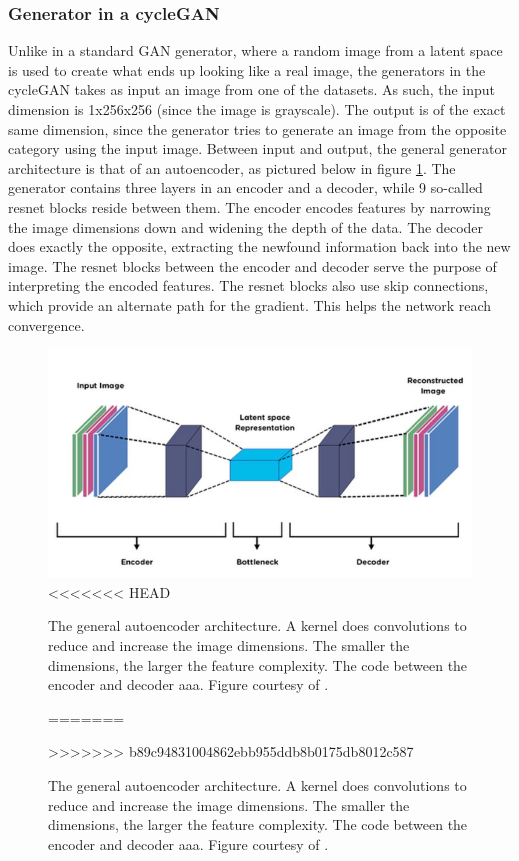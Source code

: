 \documentclass[12pt, fleqn, titlepage]{article}
\begin{document}
\subsubsection{Generator in a cycleGAN}
Unlike in a standard GAN generator, where a random image from a latent space is used to create what ends up looking like a real image, the generators in the cycleGAN takes as input an image from one of the datasets. As such, the input dimension is 1x256x256 (since the image is grayscale). The output is of the exact same dimension, since the generator tries to generate an image from the opposite category using the input image. Between input and output, the general generator architecture is that of an autoencoder, as pictured below in figure \ref{fig:autoencoder}. The generator contains three layers in an encoder and a decoder, while 9 so-called resnet blocks reside between them. The encoder encodes features by narrowing the image dimensions down and widening the depth of the data. The decoder does exactly the opposite, extracting the newfound information back into the new image. The resnet blocks between the encoder and decoder serve the purpose of interpreting the encoded features. The resnet blocks also use skip connections, which provide an alternate path for the gradient. This helps the network reach convergence.

\begin{figure}[H]
	\centering
	\includegraphics[width=0.7\linewidth]{imgs/autoencoder}
<<<<<<< HEAD
	\caption{The general autoencoder architecture. A kernel does convolutions to reduce and increase the image dimensions. The smaller the dimensions, the larger the feature complexity. The code between the encoder and decoder aaa. Figure courtesy of \cite{autoencoder}.} %
=======
	\caption{The general autoencoder architecture. A kernel does convolutions to reduce and increase the image dimensions. The smaller the dimensions, the larger the feature complexity. The code between the encoder and decoder aaa. Figure courtesy of \cite{autoencoder}.} %
>>>>>>> b89c94831004862ebb955ddb8b0175db8012c587
	\label{fig:autoencoder}
\end{figure}
\end{document}
